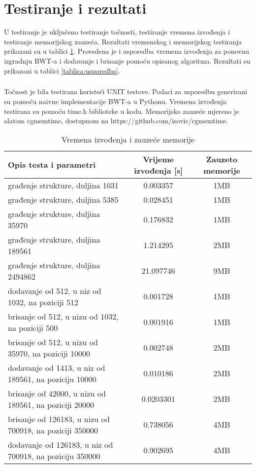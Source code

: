 \documentclass{ferseminar}
\begin{document}
\section{Testiranje i rezultati}
U testiranje je uključeno testiranje točnosti, testiranje vremena izvođenja i testiranje memorijskog zauzeća. Rezultati vremenskog i memorijskog testiranja prikazani su u tablici \ref{tablica:vremena}. Provedena je i usporedba vremena izvođenja za ponovnu izgradnju BWT-a i dodavanje i brisanje pomoću opisanog algoritma. Rezultati su prikazani u tablici \ref{tablica:usporedba}.
\subparagraph{}
Točnost je bila testirana koristeći UNIT testove. Podaci za usporedbu generirani su pomoću naivne implementacije BWT-a u Pythonu. Vremena izvođenja testirana su pomoću time.h biblioteke u kodu. Memorijsko zauzeće mjereno je alatom cgmemtime, dostupnom na https://github.com/isovic/cgmemtime.
\begin{table}[h]


\begin{tabular}{|m{7cm}|c|c| }
	\hline
	Opis testa i parametri & Vrijeme izvođenja [s] & Zauzeto memorije \\
	\hline
	građenje strukture, duljina 1031 & 0.003357 & 1MB \\
	\hline
	građenje strukture, duljina 5385 & 0.028451 & 1MB \\
	\hline
	građenje strukture, duljina 35970 & 0.176832 & 1MB \\
	\hline
	građenje strukture,  duljina 189561 & 1.214295 & 2MB \\
	\hline
	građenje strukture, duljina 2494862 & 21.097746 & 9MB \\
	\hline
	dodavanje od 512, u niz od 1032, na poziciji 512   & 0.001728 & 1MB \\
	\hline
	brisanje od 512, u nizu od 1032, na poziciji 500   & 0.001916 & 1MB \\
	\hline
	brisanje od 512, u nizu od 35970, na poziciji 10000   & 0.002748 & 2MB \\
	\hline
	dodavanje od 1413, u niz od 189561, na poziciju 10000   & 0.010186 & 2MB \\
	\hline
	brisanje od 42000, u nizu od 189561, na poziciji 20000   & 0.0203301 & 2MB \\
	\hline
	brisanje od 126183, u nizu od 700918, na poziciji 350000   & 0.738056 & 4MB \\
	\hline
	dodavanje od 126183, u niz od 700918, na poziciju 350000   & 0.902695 & 4MB \\
	\hline	
\end{tabular}
\caption{Vremena izvođenja i zauzeće memorije}
\label{tablica:vremena}
\end{table}
\end{document}
